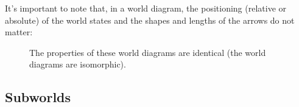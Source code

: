 It's important to note that, in a world diagram, the positioning (relative or absolute) of the world states and the shapes and lengths of the arrows do not matter:
\begin{figure}[H]
    \centering
    \caption{
    The properties of these world diagrams are identical (the world diagrams are isomorphic).
    }
    \label{fig:isomorphic_world_diagrams}
\end{figure}

\subsection{Subworlds}

